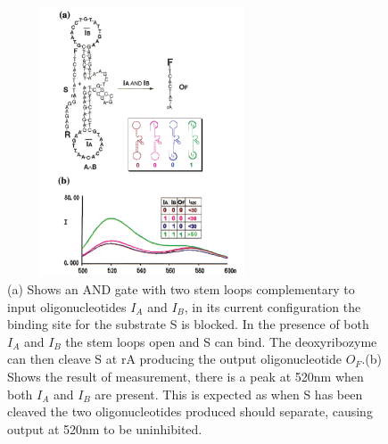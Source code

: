 \documentclass[11pt,a4paper,portrait]{article}
\begin{document}
\begin{figure}[bp!]
\centering
\includegraphics[width=80mm, height=80mm]{andgate.png}
\caption{ (a) Shows an AND gate with two stem loops complementary to input oligonucleotides $I_A$ and $I_B$, in its current configuration the binding site for the substrate S is blocked. In the presence of both $I_A$ and $I_B$ the stem loops open and S can bind. The deoxyribozyme can then cleave S at rA producing the output oligonucleotide $O_F$.(b) Shows the result of measurement, there is a peak at 520nm when both $I_A$ and $I_B$ are present. This is expected as when S has been cleaved the two oligonucleotides produced should separate, causing output at 520nm to be uninhibited. \cite{DeoxyribozymeLogic}}
\label{andgate}
\end{figure}
\clearpage
\end{document}
